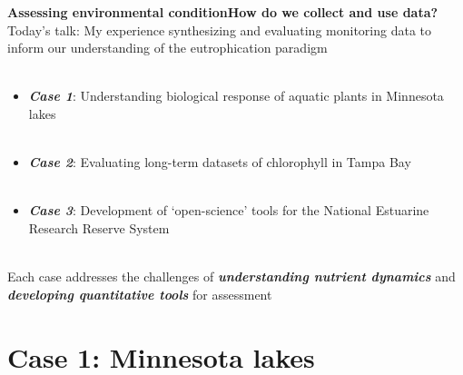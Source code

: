 \documentclass[serif]{beamer}\usepackage[]{graphicx}\usepackage[]{color}
\newcommand{\emtxt}[1]{\textbf{\textit{#1}}}
\begin{document}
\begin{frame}{\textbf{Assessing environmental condition}}{\textbf{How do we collect and use data?}}
\onslide<+->
Today's talk: My experience synthesizing and evaluating monitoring data to inform our understanding of the eutrophication paradigm\\~\\
\begin{itemize}
\item \emtxt{Case 1}: Understanding biological response of aquatic plants in Minnesota lakes \\~\\
\item \emtxt{Case 2}: Evaluating long-term datasets of chlorophyll in Tampa Bay \\~\\
\item \emtxt{Case 3}: Development of `open-science' tools for the National Estuarine Research Reserve System \\~\\
\end{itemize}
\onslide<+->
Each case addresses the challenges of \emtxt{understanding nutrient dynamics} and \emtxt{developing quantitative tools} for assessment
\end{frame}

\section{Case 1: Minnesota lakes}
\end{document}
